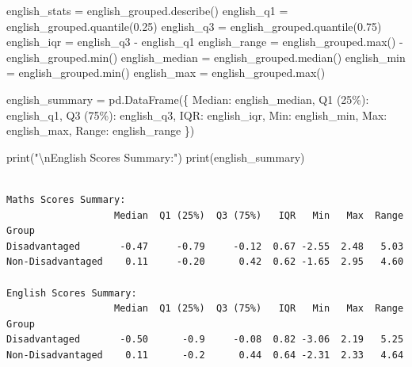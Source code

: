 \documentclass[
  letterpaper,
  DIV=11,
  numbers=noendperiod]{scrartcl}
\newenvironment{Shaded}{\begin{snugshade}}{\end{snugshade}}
\newcommand{\BuiltInTok}[1]{\textcolor[rgb]{0.00,0.23,0.31}{#1}}
\newcommand{\CharTok}[1]{\textcolor[rgb]{0.13,0.47,0.30}{#1}}
\newcommand{\FloatTok}[1]{\textcolor[rgb]{0.68,0.00,0.00}{#1}}
\newcommand{\NormalTok}[1]{\textcolor[rgb]{0.00,0.23,0.31}{#1}}
\newcommand{\OperatorTok}[1]{\textcolor[rgb]{0.37,0.37,0.37}{#1}}
\newcommand{\StringTok}[1]{\textcolor[rgb]{0.13,0.47,0.30}{#1}}
\begin{document}
\begin{Shaded}
\begin{Highlighting}[]
\NormalTok{english\_stats }\OperatorTok{=}\NormalTok{ english\_grouped.describe()}
\NormalTok{english\_q1 }\OperatorTok{=}\NormalTok{ english\_grouped.quantile(}\FloatTok{0.25}\NormalTok{)}
\NormalTok{english\_q3 }\OperatorTok{=}\NormalTok{ english\_grouped.quantile(}\FloatTok{0.75}\NormalTok{)}
\NormalTok{english\_iqr }\OperatorTok{=}\NormalTok{ english\_q3 }\OperatorTok{{-}}\NormalTok{ english\_q1}
\NormalTok{english\_range }\OperatorTok{=}\NormalTok{ english\_grouped.}\BuiltInTok{max}\NormalTok{() }\OperatorTok{{-}}\NormalTok{ english\_grouped.}\BuiltInTok{min}\NormalTok{()}
\NormalTok{english\_median }\OperatorTok{=}\NormalTok{ english\_grouped.median()}
\NormalTok{english\_min }\OperatorTok{=}\NormalTok{ english\_grouped.}\BuiltInTok{min}\NormalTok{()}
\NormalTok{english\_max }\OperatorTok{=}\NormalTok{ english\_grouped.}\BuiltInTok{max}\NormalTok{()}


\NormalTok{english\_summary }\OperatorTok{=}\NormalTok{ pd.DataFrame(\{}
    \StringTok{\textquotesingle{}Median\textquotesingle{}}\NormalTok{: english\_median,}
    \StringTok{\textquotesingle{}Q1 (25\%)\textquotesingle{}}\NormalTok{: english\_q1,}
    \StringTok{\textquotesingle{}Q3 (75\%)\textquotesingle{}}\NormalTok{: english\_q3,}
    \StringTok{\textquotesingle{}IQR\textquotesingle{}}\NormalTok{: english\_iqr,}
    \StringTok{\textquotesingle{}Min\textquotesingle{}}\NormalTok{: english\_min,}
    \StringTok{\textquotesingle{}Max\textquotesingle{}}\NormalTok{: english\_max,}
    \StringTok{\textquotesingle{}Range\textquotesingle{}}\NormalTok{: english\_range}
\NormalTok{\})}


\BuiltInTok{print}\NormalTok{(}\StringTok{"}\CharTok{\textbackslash{}n}\StringTok{English Scores Summary:"}\NormalTok{)}
\BuiltInTok{print}\NormalTok{(english\_summary)}
\end{Highlighting}
\end{Shaded}

\begin{verbatim}

Maths Scores Summary:
                   Median  Q1 (25%)  Q3 (75%)   IQR   Min   Max  Range
Group                                                                 
Disadvantaged       -0.47     -0.79     -0.12  0.67 -2.55  2.48   5.03
Non-Disadvantaged    0.11     -0.20      0.42  0.62 -1.65  2.95   4.60

English Scores Summary:
                   Median  Q1 (25%)  Q3 (75%)   IQR   Min   Max  Range
Group                                                                 
Disadvantaged       -0.50      -0.9     -0.08  0.82 -3.06  2.19   5.25
Non-Disadvantaged    0.11      -0.2      0.44  0.64 -2.31  2.33   4.64
\end{verbatim}
\end{document}
